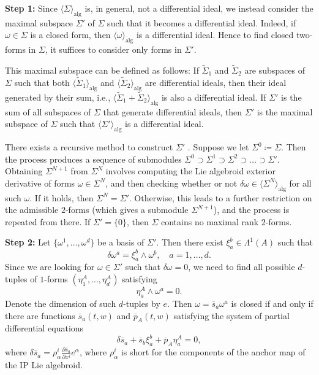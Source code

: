 \documentclass[11pt]{article}
\theoremstyle{plain}
\theoremstyle{definition}
\begin{document}
\textbf{Step 1:} Since $\langle \Sigma\rangle_{\mathrm{alg}}$ is, in general, not a differential ideal, we instead consider the maximal subspace $\Sigma'$ of $\Sigma$ such that it becomes a differential ideal. Indeed, if $\omega\in \Sigma$ is a closed form, then $\langle \omega\rangle_{\mathrm{alg}}$ is a differential ideal. Hence to find closed two-forms in $\Sigma$, it suffices to consider only forms in $\Sigma'$.

This maximal subspace can be defined as follows: If $\widetilde{\Sigma}_1$ and $\widetilde{\Sigma}_2$ are subspaces of $\Sigma$ such that both $\langle \widetilde{\Sigma}_1\rangle_{\mathrm{alg}}$ and $\langle \widetilde{\Sigma}_2\rangle_{\mathrm{alg}}$ are differential ideals, then their ideal generated by their sum, i.e., $\langle \widetilde{\Sigma}_1+\widetilde{\Sigma}_2\rangle_{\mathrm{alg}}$ is also a differential ideal. If $\Sigma'$ is the sum of all subspaces of $\Sigma$ that generate differential ideals, then $\Sigma'$ is the maximal subspace of $\Sigma$ such that $\langle \Sigma'\rangle_{\mathrm{alg}}$ is a differential ideal.

There exists a recursive method to construct $\Sigma'$ \cite[\S 5]{anderson1992invprob}. Suppose we let $\Sigma^0\coloneqq \Sigma$. Then the process produces a sequence of submodules $\Sigma^0\supset \Sigma^1\supset \Sigma^2\supset \dots\supset \Sigma'$. Obtaining $\Sigma^{N+1}$ from $\Sigma^N$ involves computing the Lie algebroid exterior derivative of forms $\omega\in \Sigma^N$, and then checking whether or not $\delta \omega\in \langle \Sigma^N\rangle_{\mathrm{alg}}$ for all such $\omega$. If it holds, then $\Sigma^N=\Sigma'$. Otherwise, this leads to a further restriction on the admissible $2$-forms (which gives a submodule $\Sigma^{N+1}$), and the process is repeated from there. If $\Sigma'=\{0\}$, then $\Sigma$ contains no maximal rank $2$-forms.

\textbf{Step 2:} Let $\{\omega^1,\dots,\omega^d\}$ be a basis of $\Sigma'$. Then there exist $\xi_a^b\in \Lambda^1(A)$ such that
\begin{equation*}
    \delta \omega^a=\xi_a^b\wedge \omega^b, \quad  a=1,\dots,d.
\end{equation*}
Since we are looking for $\omega\in \Sigma'$ such that $\delta \omega=0$, we need to find all possible $d$-tuples of $1$-forms $(\eta_1^A,\dots,\eta_d^A)$ satisfying
\begin{equation*}
    \eta_a^A\wedge \omega^a=0.
\end{equation*}
Denote the dimension of such $d$-tuples by $e$. Then $\omega = {\overline s}_a \omega^a$ is closed if and only if there are functions ${\overline s}_a(t,w)$ and ${\overline p}_A(t,w)$ satisfying the system of partial differential equations
\begin{equation}\label{deltas}
    \delta{\overline s}_a+{\overline s}_b \xi_a^b+{\overline p}_A \eta_a^A=0,
\end{equation}
where $\delta{\overline s}_a = \rho^i_\alpha\frac{\partial {\overline s}_a}{\partial x^i}e^\alpha$, where $\rho^i_\alpha$ is short for the components of the anchor map of the IP Lie algebroid.
\end{document}
